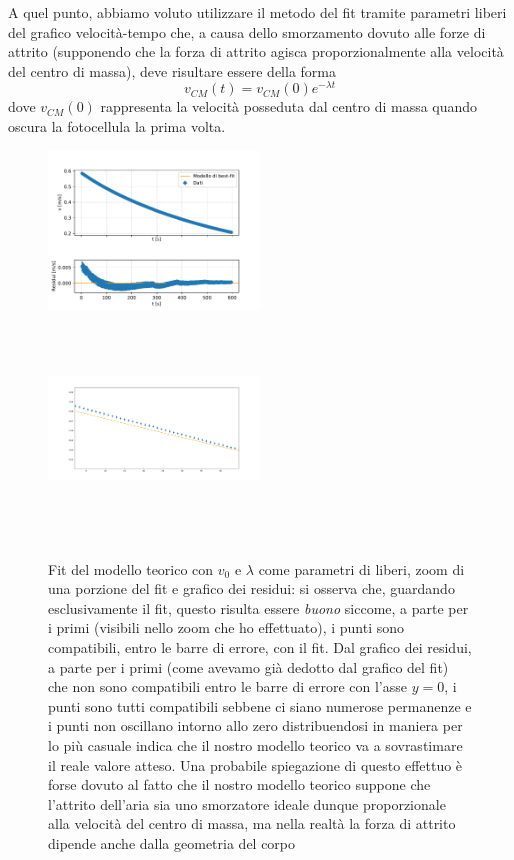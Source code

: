 \documentclass{article}
\begin{document}
A quel punto, abbiamo voluto utilizzare il metodo del fit tramite parametri liberi del grafico velocità-tempo che, a causa dello smorzamento dovuto alle forze di attrito (supponendo che la forza di attrito agisca proporzionalmente alla velocità del centro di massa), deve risultare essere della forma
\begin{equation}
	v_{CM} (t) = v_{CM} (0) e^{-\lambda t}
\end{equation}
dove $v_{CM}(0)$ rappresenta la velocità posseduta dal centro di massa quando oscura la fotocellula la prima volta.
\\

\begin{figure}
	\vspace{-1cm}
	\centering
	\includegraphics[scale=0.80, width=0.5\textwidth]{Fit_velocita.pdf}
	\includegraphics[scale=0.40, width=0.5\textwidth, height=6cm]{pendolo_quadrifilare_zoom.png}
	\caption{Fit del modello teorico con $v_0$ e $\lambda$ come parametri di liberi, zoom di una porzione del fit e grafico dei residui: si osserva che, guardando esclusivamente il fit, questo risulta essere \emph{buono} siccome, a parte per i primi (visibili nello zoom che ho effettuato), i punti sono compatibili, entro le barre di errore, con il fit. Dal grafico dei residui, a parte per i primi (come avevamo già dedotto dal grafico del fit) che non sono compatibili entro le barre di errore con l'asse $y=0$, i punti sono tutti compatibili sebbene ci siano numerose permanenze e i punti non oscillano intorno allo zero distribuendosi in maniera per lo più casuale indica che il nostro modello teorico va a sovrastimare il reale valore atteso. Una probabile spiegazione di questo effettuo è forse dovuto al fatto che il nostro modello teorico suppone che l'attrito dell'aria sia uno smorzatore ideale dunque proporzionale alla velocità del centro di massa, ma nella realtà la forza di attrito dipende anche dalla geometria del corpo}
\end{figure}
\end{document}
